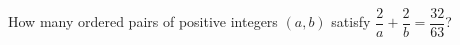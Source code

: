 How many ordered pairs of positive integers $(a,b)$ satisfy $\dfrac{2}{a}+\dfrac{2}{b}=\dfrac{32}{63}$?
